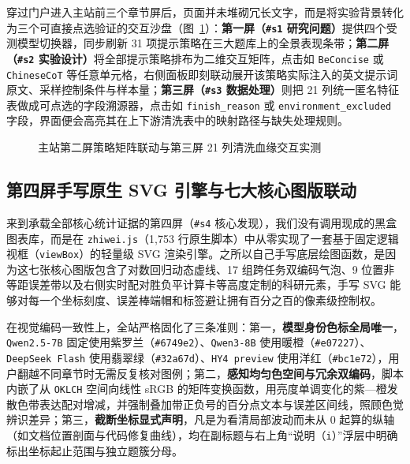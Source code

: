 穿过门户进入主站前三个章节屏后，页面并未堆砌冗长文字，而是将实验背景转化为三个可直接点选验证的交互沙盘（图~\ref{fig:s1-s2-s3}）：\textbf{第一屏（\texttt{\#s1} 研究问题）}提供四个受测模型切换器，同步刷新 31 项提示策略在三大题库上的全景表现条带；\textbf{第二屏（\texttt{\#s2} 实验设计）}将全部提示策略排布为二维交互矩阵，点击如 \texttt{BeConcise} 或 \texttt{ChineseCoT} 等任意单元格，右侧面板即刻联动展开该策略实际注入的英文提示词原文、采样控制条件与样本量；\textbf{第三屏（\texttt{\#s3} 数据处理）}则把 21 列统一匿名特征表做成可点选的字段溯源器，点击如 \texttt{finish\_reason} 或 \texttt{environment\_excluded} 字段，界面便会高亮其在上下游清洗表中的映射路径与缺失处理规则。

\begin{figure}[!htbp]
\centering
{}\hfill
{}
\caption{主站第二屏策略矩阵联动与第三屏 21 列清洗血缘交互实测}
\label{fig:s1-s2-s3}
\end{figure}

\subsection{第四屏手写原生 SVG 引擎与七大核心图版联动}

来到承载全部核心统计证据的第四屏（\texttt{\#s4} 核心发现），我们没有调用现成的黑盒图表库，而是在 \texttt{zhiwei.js}（1,753 行原生脚本）中从零实现了一套基于固定逻辑视框（\texttt{viewBox}）的轻量级 SVG 渲染引擎。之所以自己手写底层绘图函数，是因为这七张核心图版包含了对数回归动态虚线、17 组跨任务双编码气泡、9 位置非等距误差带以及右侧实时配对胜负平计算卡等高度定制的科研元素，手写 SVG 能够对每一个坐标刻度、误差棒端帽和标签避让拥有百分之百的像素级控制权。

在视觉编码一致性上，全站严格固化了三条准则：第一，\textbf{模型身份色标全局唯一}，\texttt{Qwen2.5-7B} 固定使用紫罗兰（\texttt{\#6749e2}）、\texttt{Qwen3-8B} 使用暖橙（\texttt{\#e07227}）、\texttt{DeepSeek Flash} 使用翡翠绿（\texttt{\#32a67d}）、\texttt{HY4 preview} 使用洋红（\texttt{\#bc1e72}），用户翻越不同章节时无需反复核对图例；第二，\textbf{感知均匀色空间与冗余双编码}，脚本内嵌了从 \texttt{OKLCH} 空间向线性 sRGB 的矩阵变换函数，用亮度单调变化的紫—橙发散色带表达配对增减，并强制叠加带正负号的百分点文本与误差区间线，照顾色觉辨识差异；第三，\textbf{截断坐标显式声明}，凡是为看清局部波动而未从 0 起算的纵轴（如文档位置剖面与代码修复曲线），均在副标题与右上角“说明（\texttt{i}）”浮层中明确标出坐标起止范围与独立题簇分母。

